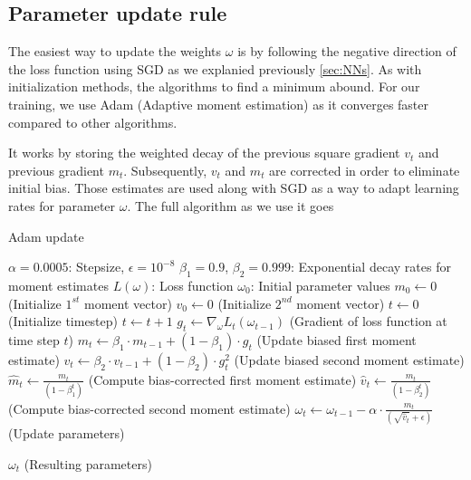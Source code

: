 \FloatBarrier

\subsection{Parameter update rule}     
The easiest way to update the weights $\omega$ is by following the negative direction of the loss function using SGD as we explanied previously \ref{sec:NNs}. As with initialization methods, the algorithms to find a minimum abound. For our training, we use Adam (Adaptive moment estimation) \cite{kingma2014adam} as it converges faster compared to other algorithms. \

It works by storing the weighted decay of the previous square gradient $v_t$ and previous gradient $m_t$. Subsequently, $v_t$ and $m_t$ are corrected in order to eliminate initial bias. Those estimates are used along with SGD as a way to adapt learning rates for parameter $\omega$. The full algorithm  as we use it goes     

\begin{algorithm}
\caption{Adam update}
\label{Adamalg}
\begin{algorithmic}[2]
    \Require $\alpha = 0.0005 $: Stepsize, $\epsilon = 10^{-8}$ 
    \Require $\beta_1 = 0.9$, $\beta_2 = 0.999$: Exponential decay rates for moment estimates
    \Require $L ( \omega ) $: Loss function
    \Require $ \omega_0 $: Initial parameter values
    \State $m_0 \leftarrow 0$ (Initialize $1^{st}$ moment vector)
    \State $v_0 \leftarrow 0$ (Initialize $2^{nd}$ moment vector)
    \State $t \leftarrow 0$ (Initialize timestep)
        \State $t \leftarrow t+1$ 
        \State $g_t \leftarrow \nabla_{\omega} L_t ( \omega_{t-1} )$ (Gradient of loss function at time step $t$)
        \State $m_t \leftarrow \beta_1 \cdot m_{t-1} + ( 1 -  \beta_1) \cdot g_t $ (Update biased first moment estimate)
        \State $v_t \leftarrow \beta_2 \cdot v_{t-1} + (1 - \beta_2) \cdot g_{t}^2 $ (Update biased second moment estimate)
        \State $\hat{m}_t \leftarrow \frac{m_t}{( 1 - \beta_{1}^{t} )}$  (Compute bias-corrected first moment estimate)
        \State $\hat{v}_t \leftarrow \frac{m_t}{( 1 - \beta_{2}^{t} )}$  (Compute bias-corrected second moment estimate)
        \State $\omega_t \leftarrow \omega_{t-1} - \alpha \cdot \frac{ \hat{m}_t }{ ( \sqrt{\hat{v}_t } + \epsilon ) } $ (Update parameters)

    \EndWhile
    
    \State \Return $\omega_t $ (Resulting parameters)   
\end{algorithmic}
\end{algorithm}

